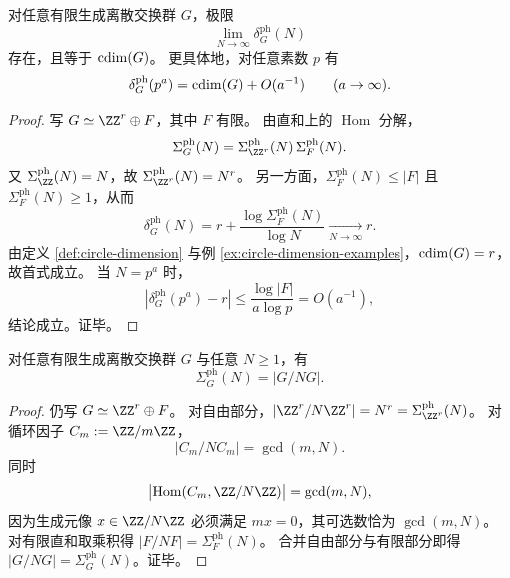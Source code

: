 \begin{theorem}[有限相位采样的圆维极限刻画]\label{thm:cdim-phase-spectrum-limit}
对任意有限生成离散交换群 \(G\)，极限
\[
\lim_{N\to\infty}\delta_G^{\mathrm{ph}}(N)
\]
存在，且等于 \(\operatorname{cdim}(G)\)。
更具体地，对任意素数 \(p\) 有
\[
\delta_G^{\mathrm{ph}}(p^a)=\operatorname{cdim}(G)+O(a^{-1})\qquad(a\to\infty).
\]
\end{theorem}
\begin{proof}
写 \(G\simeq \ZZ^r\oplus F\)，其中 \(F\) 有限。
由直和上的 \(\operatorname{Hom}\) 分解，
\[
\Sigma_G^{\mathrm{ph}}(N)
=\Sigma_{\ZZ^r}^{\mathrm{ph}}(N)\,\Sigma_F^{\mathrm{ph}}(N).
\]
又 \(\Sigma_{\ZZ}^{\mathrm{ph}}(N)=N\)，故 \(\Sigma_{\ZZ^r}^{\mathrm{ph}}(N)=N^r\)。
另一方面，\(\Sigma_F^{\mathrm{ph}}(N)\le |F|\) 且 \(\Sigma_F^{\mathrm{ph}}(N)\ge 1\)，从而
\[
\delta_G^{\mathrm{ph}}(N)
=r+\frac{\log \Sigma_F^{\mathrm{ph}}(N)}{\log N}
\xrightarrow[N\to\infty]{}r.
\]
由定义 \ref{def:circle-dimension} 与例 \ref{ex:circle-dimension-examples}，\(\operatorname{cdim}(G)=r\)，故首式成立。
当 \(N=p^a\) 时，
\[
\left|\delta_G^{\mathrm{ph}}(p^a)-r\right|
\le \frac{\log|F|}{a\log p}
=O(a^{-1}),
\]
结论成立。证毕。
\end{proof}

\begin{proposition}\label{prop:cdim-phase-spectrum-quotient}
对任意有限生成离散交换群 \(G\) 与任意 \(N\ge 1\)，有
\[
\Sigma_G^{\mathrm{ph}}(N)=|G/NG|.
\]
\end{proposition}
\begin{proof}
仍写 \(G\simeq \ZZ^r\oplus F\)。
对自由部分，\(|\ZZ^r/N\ZZ^r|=N^r=\Sigma_{\ZZ^r}^{\mathrm{ph}}(N)\)。
对循环因子 \(C_m:=\ZZ/m\ZZ\)，
\[
|C_m/NC_m|=\gcd(m,N).
\]
同时
\[
\bigl|\operatorname{Hom}(C_m,\ZZ/N\ZZ)\bigr|=\gcd(m,N),
\]
因为生成元像 \(x\in\ZZ/N\ZZ\) 必须满足 \(mx=0\)，其可选数恰为 \(\gcd(m,N)\)。
对有限直和取乘积得 \(|F/NF|=\Sigma_F^{\mathrm{ph}}(N)\)。
合并自由部分与有限部分即得 \(|G/NG|=\Sigma_G^{\mathrm{ph}}(N)\)。证毕。
\end{proof}

